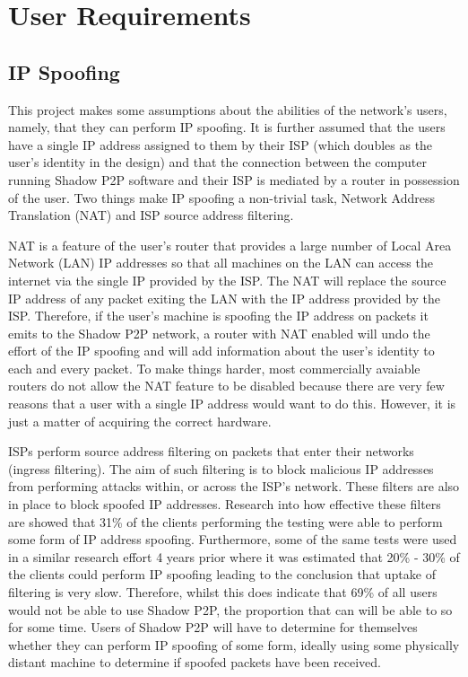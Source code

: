 \documentclass[ %
                    author={Luke Murray},
                supervisor={Dr. Simon Hollis},
                     title={Shadow Peer-to-Peer Networks},
                  subtitle={},
                    degree={MEng},
                      year={2013} ]{thesis}
\begin{document}
\section{User Requirements}
\subsection{IP Spoofing}

This project makes some assumptions about the abilities of the network's users, namely, that they can perform IP spoofing. It is further assumed that the users have a single IP address assigned to them by their ISP (which doubles as the user's identity in the design) and that the connection between the computer running Shadow P2P software and their ISP is mediated by a router in possession of the user. Two things make IP spoofing a non-trivial task, Network Address Translation (NAT) and ISP source address filtering.

NAT is a feature of the user's router that provides a large number of Local Area Network (LAN) IP addresses so that all machines on the LAN can access the internet via the single IP provided by the ISP. The NAT will replace the source IP address of any packet exiting the LAN with the IP address provided by the ISP. Therefore, if the user's machine is spoofing the IP address on packets it emits to the Shadow P2P network, a router with NAT enabled will undo the effort of the IP spoofing and will add information about the user's identity to each and every packet. To make things harder, most commercially avaiable routers do not allow the NAT feature to be disabled because there are very few reasons that a user with a single IP address would want to do this. However, it is just a matter of acquiring the correct hardware.

ISPs perform source address filtering on packets that enter their networks (ingress filtering). The aim of such filtering is to block malicious IP addresses from performing attacks within, or across the ISP's network. These filters are also in place to block spoofed IP addresses. Research into how effective these filters are showed that 31\% of the clients performing the testing were able to perform some form of IP address spoofing\cite{beverly2009understanding}. Furthermore, some of the same tests were used in a similar research effort 4 years prior\cite{bb-spoofer-sruti} where it was estimated that 20\% - 30\% of the clients could perform IP spoofing leading to the conclusion that uptake of filtering is very slow. Therefore, whilst this does indicate that 69\% of all users would not be able to use Shadow P2P, the proportion that can will be able to so for some time. Users of Shadow P2P will have to determine for themselves whether they can perform IP spoofing of some form, ideally using some physically distant machine to determine if spoofed packets have been received.
\end{document}
